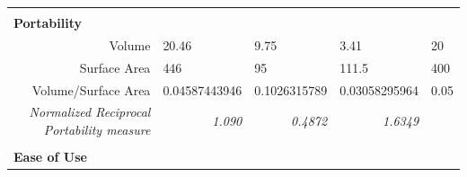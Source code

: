 \documentclass[12pt]{article}
\begin{document}
\begin{table}[h]
{\begin{tabular}{rllll}
\multicolumn{1}{l}{}                           &                                                                   &                                                                   &                                                                   &                           \\
\multicolumn{1}{l}{\textbf{Portability}}       &                                                                   &                                                                   &                                                                   &                           \\ \cline{1-1}
Volume                                         & 20.46                                                             & 9.75                                                              & 3.41                                                              & 20                        \\
Surface Area                                   & 446                                                               & 95                                                                & 111.5                                                             & 400                       \\
Volume/Surface Area                            & 0.04587443946                                                     & 0.1026315789                                                      & 0.03058295964                                                     & 0.05                      \\
\rowcolor[HTML]{C0C0C0} 
\textit{Normalized Reciprocal Portability measure}         & \multicolumn{1}{r}{\cellcolor[HTML]{C0C0C0}\textit{1.090}} & \multicolumn{1}{r}{\cellcolor[HTML]{C0C0C0}\textit{0.4872}}  & \multicolumn{1}{r}{\cellcolor[HTML]{C0C0C0}\textit{1.6349}} & \textit{}                 \\
\multicolumn{1}{l}{}                           &                                                                   &                                                                   &                                                                   &                           \\
\multicolumn{1}{l}{\textbf{Ease of Use}}       &                                                                   &                                                                   &                                                                   &                           \\ \cline{1-1}

\end{tabular}}
\end{table}
\end{document}
